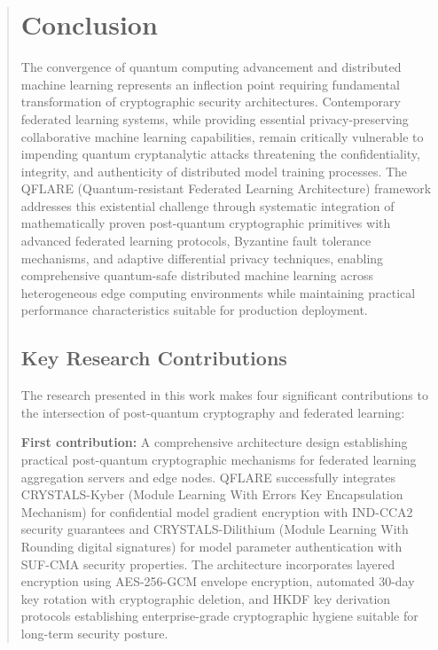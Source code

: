 \documentclass{svproc}
\begin{document}
\begin{abstract}
\section{Conclusion}
\label{sec:conclusion}

The convergence of quantum computing advancement and distributed machine learning represents an inflection point requiring fundamental transformation of cryptographic security architectures. Contemporary federated learning systems, while providing essential privacy-preserving collaborative machine learning capabilities, remain critically vulnerable to impending quantum cryptanalytic attacks threatening the confidentiality, integrity, and authenticity of distributed model training processes. The QFLARE (Quantum-resistant Federated Learning Architecture) framework addresses this existential challenge through systematic integration of mathematically proven post-quantum cryptographic primitives with advanced federated learning protocols, Byzantine fault tolerance mechanisms, and adaptive differential privacy techniques, enabling comprehensive quantum-safe distributed machine learning across heterogeneous edge computing environments while maintaining practical performance characteristics suitable for production deployment.

\subsection{Key Research Contributions}

The research presented in this work makes four significant contributions to the intersection of post-quantum cryptography and federated learning:

\textbf{First contribution:} A comprehensive architecture design establishing practical post-quantum cryptographic mechanisms for federated learning aggregation servers and edge nodes. QFLARE successfully integrates CRYSTALS-Kyber (Module Learning With Errors Key Encapsulation Mechanism) for confidential model gradient encryption with IND-CCA2 security guarantees and CRYSTALS-Dilithium (Module Learning With Rounding digital signatures) for model parameter authentication with SUF-CMA security properties. The architecture incorporates layered encryption using AES-256-GCM envelope encryption, automated 30-day key rotation with cryptographic deletion, and HKDF key derivation protocols establishing enterprise-grade cryptographic hygiene suitable for long-term security posture.


\end{abstract}
\end{document}
